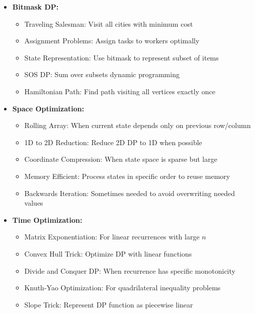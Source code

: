 \documentclass[a4paper,10pt]{book}
\begin{document}
\begin{itemize}[leftmargin=*]
    \item \textbf{Bitmask DP:}
    \begin{itemize}
        \item Traveling Salesman: Visit all cities with minimum cost
        \item Assignment Problems: Assign tasks to workers optimally
        \item State Representation: Use bitmask to represent subset of items
        \item SOS DP: Sum over subsets dynamic programming
        \item Hamiltonian Path: Find path visiting all vertices exactly once
    \end{itemize}
\end{itemize}

\begin{itemize}[leftmargin=*]
    \item \textbf{Space Optimization:}
    \begin{itemize}
        \item Rolling Array: When current state depends only on previous row/column
        \item 1D to 2D Reduction: Reduce 2D DP to 1D when possible
        \item Coordinate Compression: When state space is sparse but large
        \item Memory Efficient: Process states in specific order to reuse memory
        \item Backwards Iteration: Sometimes needed to avoid overwriting needed values
    \end{itemize}

    \item \textbf{Time Optimization:}
    \begin{itemize}
        \item Matrix Exponentiation: For linear recurrences with large $n$
        \item Convex Hull Trick: Optimize DP with linear functions
        \item Divide and Conquer DP: When recurrence has specific monotonicity
        \item Knuth-Yao Optimization: For quadrilateral inequality problems
        \item Slope Trick: Represent DP function as piecewise linear
    \end{itemize}
\end{itemize}
\end{document}
